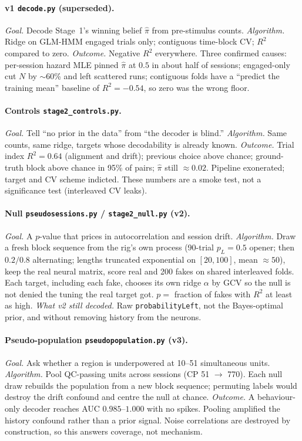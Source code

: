 \documentclass[11pt,a4paper]{article}
\begin{document}
\paragraph{v1 \texttt{decode.py} (superseded).}
\textit{Goal.} Decode Stage~1's winning belief $\hat\pi$ from pre-stimulus
counts. \textit{Algorithm.} Ridge on GLM-HMM engaged trials only; contiguous
time-block CV; $R^2$ compared to zero. \textit{Outcome.} Negative $R^2$
everywhere. Three confirmed causes: per-session hazard MLE pinned
$\hat\pi$ at $0.5$ in about half of sessions; engaged-only cut $N$ by
$\sim$60\% and left scattered runs; contiguous folds have a ``predict the
training mean'' baseline of $R^2=-0.54$, so zero was the wrong floor.

\paragraph{Controls \texttt{stage2\_controls.py}.}
\textit{Goal.} Tell ``no prior in the data'' from ``the decoder is blind.''
\textit{Algorithm.} Same counts, same ridge, targets whose decodability is
already known. \textit{Outcome.} Trial index $R^2=0.64$ (alignment and
drift); previous choice above chance; ground-truth block above chance in
95\% of pairs; $\hat\pi$ still $\approx 0.02$. Pipeline exonerated; target
and CV scheme indicted. These numbers are a smoke test, not a significance
test (interleaved CV leaks).

\paragraph{Null \texttt{pseudosessions.py} / \texttt{stage2\_null.py} (v2).}
\textit{Goal.} A $p$-value that prices in autocorrelation and session drift.
\textit{Algorithm.} Draw a fresh block sequence from the rig's own process
(90-trial $p_L=0.5$ opener; then $0.2/0.8$ alternating; lengths truncated
exponential on $[20,100]$, mean $\approx 50$), keep the real neural matrix,
score real and 200 fakes on shared interleaved folds. Each target, including
each fake, chooses its own ridge $\alpha$ by GCV so the null is not denied
the tuning the real target got. $p=$ fraction of fakes with $R^2$ at least
as high. \textit{What v2 still decoded.} Raw \texttt{probabilityLeft}, not
the Bayes-optimal prior, and without removing history from the neurons.

\paragraph{Pseudo-population \texttt{pseudopopulation.py} (v3).}
\textit{Goal.} Ask whether a region is underpowered at 10--51 simultaneous
units. \textit{Algorithm.} Pool QC-passing units across sessions (CP 51
$\to$ 770). Each null draw rebuilds the population from a new block sequence;
permuting labels would destroy the drift confound and centre the null at
chance. \textit{Outcome.} A behaviour-only decoder reaches AUC
$0.985$--$1.000$ with no spikes. Pooling amplified the history confound
rather than a prior signal. Noise correlations are destroyed by construction,
so this answers coverage, not mechanism.
\end{document}
